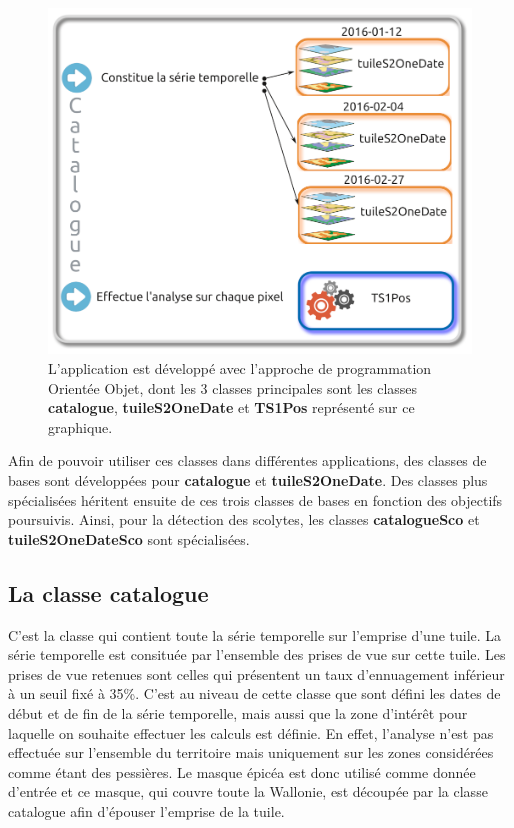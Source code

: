 \documentclass[a4paper, 12pt]{article} %
\begin{document}
\begin{figure}
	\centering
	\includegraphics[width=\linewidth]{illuAppliS2TS.png}
	\caption{L'application est développé avec l'approche de programmation Orientée Objet, dont les 3 classes principales sont les classes \textbf{catalogue}, \textbf{tuileS2OneDate} et \textbf{TS1Pos} représenté sur ce graphique.\textbf{}}
	\label{fig:classes}
\end{figure}

Afin de pouvoir utiliser ces classes dans différentes applications, des classes de bases sont développées pour \textbf{catalogue} et \textbf{tuileS2OneDate}. Des classes plus spécialisées héritent ensuite de ces trois classes de bases en fonction des objectifs poursuivis. Ainsi, pour la détection des scolytes, les classes \textbf{catalogueSco} et \textbf{tuileS2OneDateSco}  sont spécialisées.


\subsection{La classe \textbf{catalogue}}

C'est la classe qui contient toute la série temporelle sur l'emprise d'une tuile. La série temporelle est consituée par l'ensemble des prises de vue sur cette tuile. Les prises de vue retenues sont celles qui présentent un taux d'ennuagement inférieur à un seuil fixé à 35\%. C'est au niveau de cette classe que sont défini les dates de début et de fin de la série temporelle, mais aussi que la zone d'intérêt pour laquelle on souhaite effectuer les calculs est définie. En effet, l'analyse n'est pas effectuée sur l'ensemble du territoire mais uniquement sur les zones considérées comme étant des pessières. Le masque épicéa est donc utilisé comme donnée d'entrée et ce masque, qui couvre toute la Wallonie, est découpée par la classe catalogue afin d'épouser l'emprise de la tuile.
\end{document}
